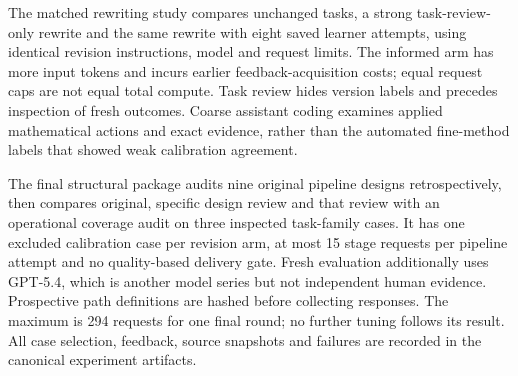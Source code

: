 The matched rewriting study compares unchanged tasks, a strong task-review-only rewrite and the same rewrite with eight saved learner attempts, using identical revision instructions, model and request limits. The informed arm has more input tokens and incurs earlier feedback-acquisition costs; equal request caps are not equal total compute. Task review hides version labels and precedes inspection of fresh outcomes. Coarse assistant coding examines applied mathematical actions and exact evidence, rather than the automated fine-method labels that showed weak calibration agreement.

The final structural package audits nine original pipeline designs retrospectively, then compares original, specific design review and that review with an operational coverage audit on three inspected task-family cases. It has one excluded calibration case per revision arm, at most 15 stage requests per pipeline attempt and no quality-based delivery gate. Fresh evaluation additionally uses GPT-5.4, which is another model series but not independent human evidence. Prospective path definitions are hashed before collecting responses. The maximum is 294 requests for one final round; no further tuning follows its result. All case selection, feedback, source snapshots and failures are recorded in the canonical experiment artifacts.
